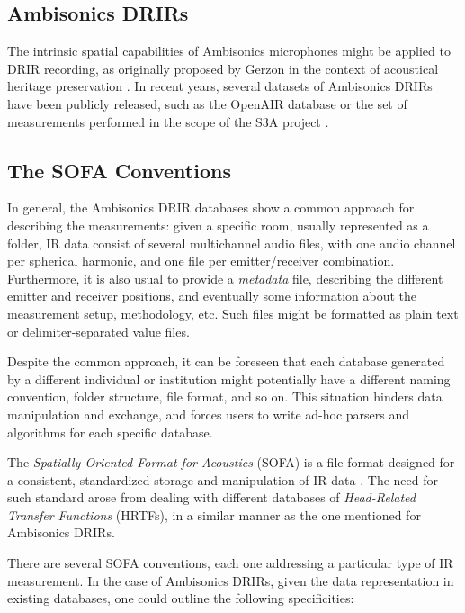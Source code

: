\subsection{Ambisonics DRIRs}

The intrinsic spatial capabilities of Ambisonics microphones might be applied to DRIR recording, as originally proposed by Gerzon in the context of acoustical heritage preservation \cite{gerzon1975recording}. In recent years, several datasets of Ambisonics DRIRs have been publicly released, such as the OpenAIR database \cite{murphy2010openair} or the set of  measurements performed in the scope of the S3A project \cite{coleman2015s3a,openair}. 

\subsection{The SOFA Conventions}

In general, the Ambisonics DRIR databases show a common approach for describing the measurements: given a specific room, usually represented as a folder, IR data consist of several multichannel audio files, with one audio channel per spherical harmonic, and one file per emitter/receiver combination. Furthermore, it is also usual to provide a \textit{metadata} file, describing the different emitter and receiver positions, and eventually some information about the measurement setup, methodology, etc. Such files might be formatted as plain text or delimiter-separated value files.

Despite the common approach, it can be foreseen that each database generated by a different individual or institution might potentially have a different naming convention, folder structure, file format, and so on. This situation hinders data manipulation and exchange, and forces users to write ad-hoc parsers and algorithms for each specific database.

The \textit{Spatially Oriented Format for Acoustics} (SOFA) is a file format designed for a consistent, standardized storage and manipulation of IR data \cite{majdak2015aes69}. The need for such standard arose from dealing with different databases of \textit{Head-Related Transfer Functions} (HRTFs), in a similar manner as the one mentioned for Ambisonics DRIRs.

There are several SOFA conventions, each one addressing a particular type of IR measurement. In the case of Ambisonics DRIRs, given the data representation in existing databases, one could outline the following specificities:
 
